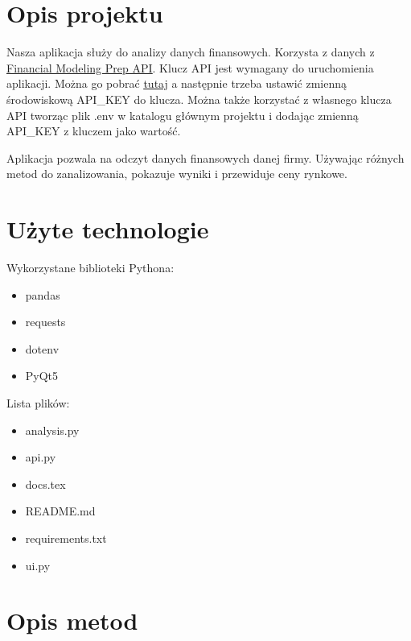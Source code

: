 \documentclass[12pt]{article}
\begin{document}
	\maketitle
	\tableofcontents
	\newpage
	
	\section{Opis projektu}\label{sec:opis-projektu}
	Nasza aplikacja służy do analizy danych finansowych.
	Korzysta z danych z \underline{\href{https://site.financialmodelingprep.com/developer/docs/}{Financial Modeling Prep API}}.
	Klucz API jest wymagany do uruchomienia aplikacji.
	Można go pobrać \underline{\href{https://site.financialmodelingprep.com/login}{tutaj}} a następnie
	trzeba ustawić zmienną środowiskową API\_KEY do klucza.
	Można także korzystać z własnego klucza API tworząc plik .env w katalogu głównym projektu i
	dodając zmienną API\_KEY z kluczem jako wartość.

	Aplikacja pozwala na odczyt danych finansowych danej firmy.
	Używając różnych metod do zanalizowania, pokazuje wyniki i przewiduje ceny rynkowe.

	\section{Użyte technologie}\label{sec:uzyte-echnologie}

	 Wykorzystane biblioteki Pythona:
	\begin{itemize}
		\item pandas
		\item requests
		\item dotenv
		\item PyQt5
	\end{itemize}

	Lista plików:
	\begin{itemize}
		\item analysis.py
		\item api.py
		\item docs.tex
		\item README.md
		\item requirements.txt
		\item ui.py
	\end{itemize}

	\section{Opis metod}\label{sec:uzyte-metody}
\end{document}
